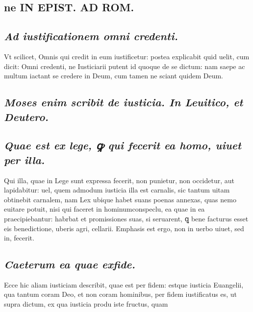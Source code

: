 \documentclass{article}
\begin{document}
\begin{pages}
\section*{ne IN EPIST. AD ROM.  }
\marginpar{[ p.]}
{}
\subsection*{\textit{Ad iustificationem omni credenti. }}\pstart Vt scilicet, Omnis qui credit in eum iustificetur: postea explicabit quid uelit, cum dicit: Omni credenti, ne Iusticiarii putent id quoque de se dictum: nam saepe ac multum iactant se credere in Deum, cum tamen ne sciant quidem Deum.  \pend
{}
{}
\subsection*{\textit{Moses enim scribit de iusticia. In Leuitico, et Deutero. }}
{}
\subsection*{\textit{Quae est ex lege, ꝙ qui fecerit ea homo, uiuet per illa. }}\pstart Qui illa, quae in Lege sunt expressa fecerit, non punietur, non occidetur, aut lapidabitur: uel, quem admodum iusticia illa est carnalis, sic tantum uitam obtinebit carnalem, nam Lex ubique habet suans poenas annexas, quas nemo euitare potuit, nisi qui faceret in hominumconspeclu, ea quae in ea praecipiebantur: habrbat et promissiones suas, si seruarent, ꝗ bene facturus esset eis benedictione, uberis agri, cellarii. Emphasis est ergo, non in uerbo uiuet, sed in, fecerit.   \pend
{}
{}
\subsection*{\textit{Caeterum ea quae exfide. }}\pstart Ecce hic aliam iusticiam describit, quae est per fidem: estque iusticia Euangelii, qua tantum coram Deo, et non coram hominibus, per fidem iustificatus es, ut supra dictum, ex qua iusticia produ iste fructus, quam  \pend

\end{pages}
\end{document}
